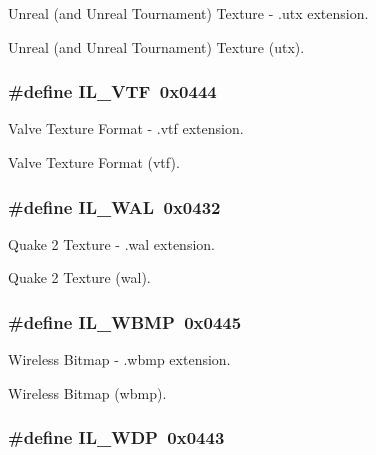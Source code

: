 Unreal (and Unreal Tournament) Texture -\/ .utx extension. 

Unreal (and Unreal Tournament) Texture (utx). \hypertarget{group__il__formats_gac78df8193efc63314efa495217a36d63}{
\subsubsection[{I\+L\+\_\+\+V\+T\+F}]{\setlength{\rightskip}{0pt plus 5cm}\#define I\+L\+\_\+\+V\+T\+F~0x0444}}\label{group__il__formats_gac78df8193efc63314efa495217a36d63}


Valve Texture Format -\/ .vtf extension. 

Valve Texture Format (vtf). \hypertarget{group__il__formats_gab1e8eb9dd24155726d1469e1eae756dc}{
\subsubsection[{I\+L\+\_\+\+W\+A\+L}]{\setlength{\rightskip}{0pt plus 5cm}\#define I\+L\+\_\+\+W\+A\+L~0x0432}}\label{group__il__formats_gab1e8eb9dd24155726d1469e1eae756dc}


Quake 2 Texture -\/ .wal extension. 

Quake 2 Texture (wal). \hypertarget{group__il__formats_gacabbc0ef52f005e4890c683a70c38cd6}{
\subsubsection[{I\+L\+\_\+\+W\+B\+M\+P}]{\setlength{\rightskip}{0pt plus 5cm}\#define I\+L\+\_\+\+W\+B\+M\+P~0x0445}}\label{group__il__formats_gacabbc0ef52f005e4890c683a70c38cd6}


Wireless Bitmap -\/ .wbmp extension. 

Wireless Bitmap (wbmp). \hypertarget{group__il__formats_gaf17515a28c935dc8c01ed6f98a5d7ea5}{
\subsubsection[{I\+L\+\_\+\+W\+D\+P}]{\setlength{\rightskip}{0pt plus 5cm}\#define I\+L\+\_\+\+W\+D\+P~0x0443}}\label{group__il__formats_gaf17515a28c935dc8c01ed6f98a5d7ea5}


